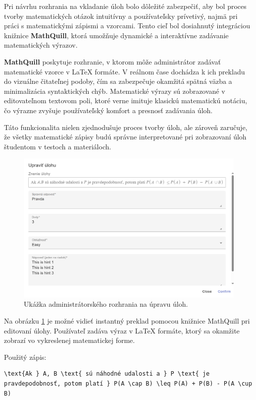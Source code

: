 Pri návrhu rozhrania na vkladanie úloh bolo dôležité zabezpečiť, aby bol proces tvorby matematických otázok intuitívny a používateľsky prívetivý, najmä pri práci s matematickými zápismi a vzorcami.
 Tento cieľ bol dosiahnutý integráciou knižnice \textbf{MathQuill}, ktorá umožňuje dynamické a interaktívne zadávanie matematických výrazov.

\textbf{MathQuill} poskytuje rozhranie, v ktorom môže administrátor zadávať matematické vzorce v LaTeX formáte. 
V reálnom čase dochádza k ich prekladu do vizuálne čitateľnej podoby, čím sa zabezpečuje okamžitá spätná väzba a minimalizácia syntaktických chýb.
 Matematické výrazy sú zobrazované v editovateľnom textovom poli, ktoré verne imituje klasickú matematickú notáciu, čo výrazne zvyšuje používateľský komfort a presnosť zadávania úloh.

Táto funkcionalita nielen zjednodušuje proces tvorby úloh, ale zároveň zaručuje, že všetky matematické zápisy budú správne interpretované pri zobrazovaní úloh študentom v testoch a materiáloch.

\begin{figure}[H]
  \centering
  \includegraphics[width=14cm]{img/edit_ulohy.png}
  \caption{Ukážka administrátorského rozhrania na úpravu úloh.}
  \label{fig:admin_edit}
\end{figure}

Na obrázku \ref{fig:admin_edit} je možné vidieť instantný preklad pomocou knižnice MathQuill pri editovaní úlohy. Používateľ zadáva výraz v LaTeX formáte, ktorý sa okamžite zobrazí vo vykreslenej matematickej forme.

Použitý zápis:
\begin{lstlisting}[style=code-listing, caption={LaTeX zápis matematického výrazu}]
  \text{Ak } A, B \text{ sú náhodné udalosti a } P \text{ je pravdepodobnosť, potom platí } P(A \cap B) \leq P(A) + P(B) - P(A \cup B)
  \end{lstlisting}
  


